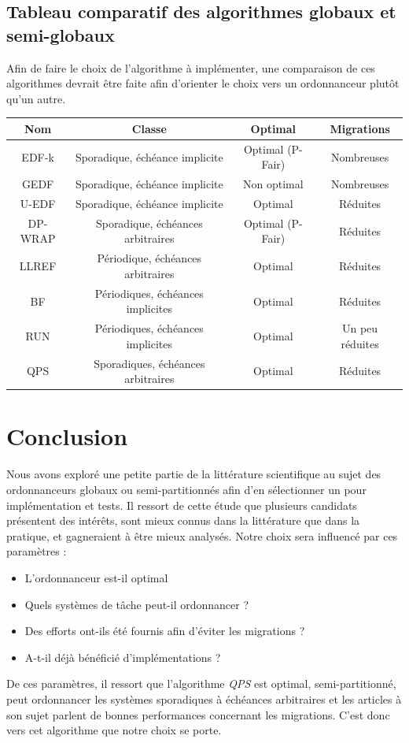 \documentclass[11pt,a4paper,oneside]{report}
\begin{document}
	\subsection{Tableau comparatif des algorithmes globaux et semi-globaux}
	Afin de faire le choix de l'algorithme à implémenter, une comparaison de ces algorithmes 
	devrait être faite afin d'orienter le choix vers un ordonnanceur plutôt qu'un autre. 
	
	\vspace{1em}
	
	\begin{tabular}{|c|c|c|c|}
		\hline
		\textbf{Nom} & \textbf{Classe} &  \textbf{Optimal} & \textbf{Migrations}\\
		\hline
		\hline
		EDF-k & Sporadique, échéance implicite & Optimal (P-Fair) & Nombreuses \\
		\hline
		GEDF & Sporadique, échéance implicite & Non optimal & Nombreuses \\
		\hline    
		U-EDF & Sporadique, échéance implicite  & Optimal & Réduites\\
		\hline
		DP-WRAP & Sporadique, échéances arbitraires & Optimal (P-Fair)& Réduites\\
		\hline
		LLREF & Périodique, échéances arbitraires & Optimal & Réduites \\
		\hline
		BF & Périodiques, échéances implicites & Optimal & Réduites \\
		\hline
		RUN & Périodiques, échéances implicites & Optimal & Un peu réduites\\
		\hline
		QPS & Sporadiques, échéances arbitraires & Optimal & Réduites\\
		\hline
		
	\end{tabular}
	\bigskip
	
	\section{Conclusion}
	Nous avons exploré une petite partie de la littérature scientifique au sujet des ordonnanceurs 
	globaux ou semi-partitionnés afin d'en sélectionner un pour implémentation et tests. 
	Il ressort de cette étude que plusieurs candidats présentent des intérêts, sont mieux 
	connus dans la littérature que dans la pratique, et gagneraient à être mieux analysés. 
	Notre choix sera influencé par ces paramètres : \medskip
	\begin{itemize}
		\item L'ordonnanceur est-il optimal
		\item Quels systèmes de tâche peut-il ordonnancer ?
		\item Des efforts ont-ils été fournis afin d'éviter les migrations ?
		\item A-t-il déjà bénéficié d'implémentations ?
	\end{itemize}
	De ces paramètres, il ressort que l'algorithme \textit{QPS} est optimal, semi-partitionné, 
	peut ordonnancer les systèmes sporadiques à échéances arbitraires et 
	les articles à son sujet parlent de bonnes performances concernant les migrations. \medskip
	C'est donc vers cet algorithme que notre choix se porte.
	
	
	
	
	
\end{document}
